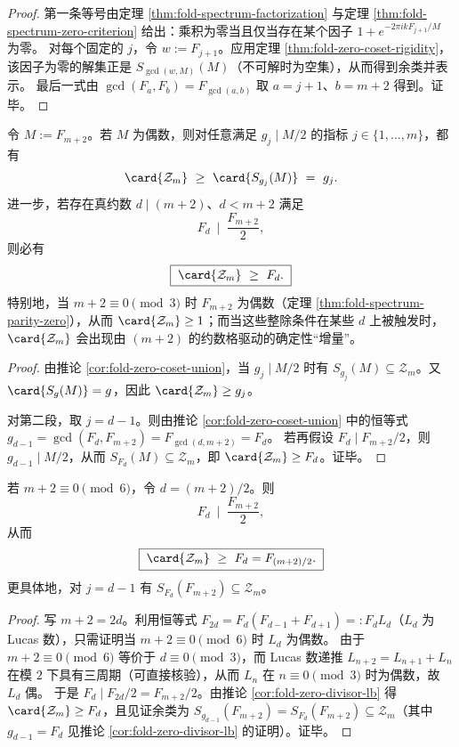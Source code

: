 \begin{proof}
第一条等号由定理 \ref{thm:fold-spectrum-factorization} 与定理 \ref{thm:fold-spectrum-zero-criterion} 给出：乘积为零当且仅当存在某个因子 \(1+e^{-2\pi i kF_{j+1}/M}\) 为零。
对每个固定的 \(j\)，令 \(w:=F_{j+1}\)。应用定理 \ref{thm:fold-zero-coset-rigidity}，该因子为零的解集正是 \(S_{\gcd(w,M)}(M)\)（不可解时为空集），从而得到余类并表示。
最后一式由 \(\gcd(F_a,F_b)=F_{\gcd(a,b)}\) 取 \(a=j+1\)、\(b=m+2\) 得到。证毕。
\end{proof}

\begin{corollary}\label{cor:fold-zero-divisor-lb}
令 \(M:=F_{m+2}\)。若 \(M\) 为偶数，则对任意满足 \(g_j\mid M/2\) 的指标 \(j\in\{1,\dots,m\}\)，都有
\[
\card{\mathcal{Z}_m}\ \ge\ \card{S_{g_j}(M)}\ =\ g_j.
\]
进一步，若存在真约数 \(d\mid(m+2)\)、\(d<m+2\) 满足
\[
F_d\ \mid\ \frac{F_{m+2}}{2},
\]
则必有
\[
\boxed{\;\card{\mathcal{Z}_m}\ \ge\ F_d.\;}
\]
特别地，当 \(m+2\equiv 0\pmod 3\) 时 \(F_{m+2}\) 为偶数（定理 \ref{thm:fold-spectrum-parity-zero}），从而 \(\card{\mathcal{Z}_m}\ge 1\)；而当这些整除条件在某些 \(d\) 上被触发时，\(\card{\mathcal{Z}_m}\) 会出现由 \((m+2)\) 的约数格驱动的确定性“增量”。
\end{corollary}
\begin{proof}
由推论 \ref{cor:fold-zero-coset-union}，当 \(g_j\mid M/2\) 时有 \(S_{g_j}(M)\subseteq \mathcal{Z}_m\)。又 \(\card{S_g(M)}=g\)，因此 \(\card{\mathcal{Z}_m}\ge g_j\)。
\par
对第二段，取 \(j=d-1\)。则由推论 \ref{cor:fold-zero-coset-union} 中的恒等式
\(
g_{d-1}=\gcd(F_d,F_{m+2})=F_{\gcd(d,m+2)}=F_d
\)。
若再假设 \(F_d\mid F_{m+2}/2\)，则 \(g_{d-1}\mid M/2\)，从而 \(S_{F_d}(M)\subseteq \mathcal{Z}_m\)，即 \(\card{\mathcal{Z}_m}\ge F_d\)。证毕。
\end{proof}

\begin{corollary}[六倍窗的半阶大陪集零点块]\label{cor:fold-zero-half-index-multiple6}
若 \(m+2\equiv 0\pmod 6\)，令 \(d=(m+2)/2\)。则
\[
F_d\ \mid\ \frac{F_{m+2}}{2},
\]
从而
\[
\boxed{\;\card{\mathcal{Z}_m}\ \ge\ F_d=F_{(m+2)/2}.\;}
\]
更具体地，对 \(j=d-1\) 有 \(S_{F_d}(F_{m+2})\subseteq \mathcal{Z}_m\)。
\end{corollary}
\begin{proof}
写 \(m+2=2d\)。利用恒等式 \(F_{2d}=F_d(F_{d-1}+F_{d+1})=:F_dL_d\)（\(L_d\) 为 Lucas 数），只需证明当 \(m+2\equiv 0\pmod 6\) 时 \(L_d\) 为偶数。
由于 \(m+2\equiv 0\pmod 6\) 等价于 \(d\equiv 0\pmod 3\)，而 Lucas 数递推 \(L_{n+2}=L_{n+1}+L_n\) 在模 \(2\) 下具有三周期（可直接核验），从而 \(L_n\) 在 \(n\equiv 0\pmod 3\) 时为偶数，故 \(L_d\) 偶。
于是 \(F_d\mid F_{2d}/2=F_{m+2}/2\)。由推论 \ref{cor:fold-zero-divisor-lb} 得 \(\card{\mathcal{Z}_m}\ge F_d\)，且见证余类为 \(S_{g_{d-1}}(F_{m+2})=S_{F_d}(F_{m+2})\subseteq \mathcal{Z}_m\)（其中 \(g_{d-1}=F_d\) 见推论 \ref{cor:fold-zero-divisor-lb} 的证明）。证毕。
\end{proof}

